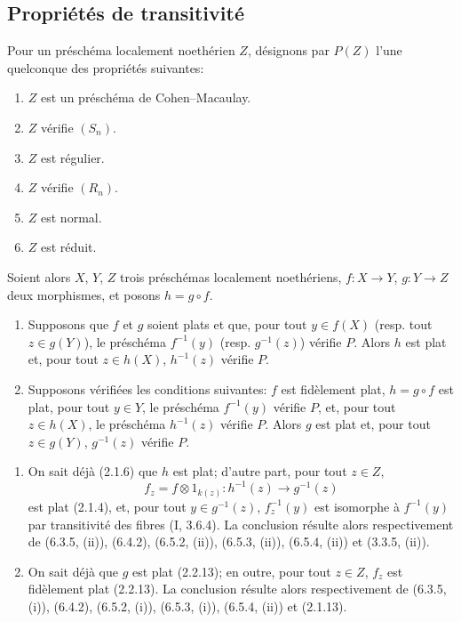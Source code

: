 
\subsection{Propriétés de transitivité}

\begin{proposition}[6.6.1]
\label{IV.2.s6.6.1-fr}
Pour un préschéma localement noethérien $Z$, désignons par $P(Z)$ l'une
quelconque des propriétés suivantes:
\begin{enumerate}
\item[(a)] $Z$ est un préschéma de Cohen--Macaulay.
\item[(b)] $Z$ vérifie $(S_n)$.
\item[(c)] $Z$ est régulier.
\item[(d)] $Z$ vérifie $(R_n)$.
\item[(e)] $Z$ est normal.
\item[(f)] $Z$ est réduit.
\end{enumerate}
Soient alors $X$, $Y$, $Z$ trois préschémas localement noethériens,
$f:X\to Y$, $g:Y\to Z$ deux morphismes, et posons $h=g\circ f$.
\begin{enumerate}
\item[(i)] Supposons que $f$ et $g$ soient plats et que, pour tout
$y\in f(X)$ (resp. tout $z\in g(Y)$), le préschéma $f^{-1}(y)$
(resp. $g^{-1}(z)$) vérifie $P$. Alors $h$ est plat et, pour tout
$z\in h(X)$, $h^{-1}(z)$ vérifie $P$.
\item[(ii)] Supposons vérifiées les conditions suivantes: $f$ est
fidèlement plat, $h=g\circ f$ est plat, pour tout $y\in Y$, le
préschéma $f^{-1}(y)$ vérifie $P$, et, pour tout $z\in h(X)$, le
préschéma $h^{-1}(z)$ vérifie $P$. Alors $g$ est plat et, pour tout
$z\in g(Y)$, $g^{-1}(z)$ vérifie $P$.
\end{enumerate}
\begin{enumerate}
\item[(i)] On sait déjà (2.1.6) que $h$ est plat; d'autre part, pour
      tout $z\in Z$,
\[
 f_z=f\otimes 1_{k(z)}:h^{-1}(z)\longrightarrow g^{-1}(z)
\]
est plat (2.1.4), et, pour tout $y\in g^{-1}(z)$, $f_z^{-1}(y)$ est
isomorphe à $f^{-1}(y)$ par transitivité des fibres (I, 3.6.4). La
conclusion résulte alors respectivement de (6.3.5, (ii)), (6.4.2),
(6.5.2, (ii)), (6.5.3, (ii)), (6.5.4, (ii)) et (3.3.5, (ii)).
\item[(ii)] On sait déjà que $g$ est plat (2.2.13); en outre, pour
      tout $z\in Z$, $f_z$ est fidèlement plat (2.2.13). La conclusion
      résulte alors respectivement de (6.3.5, (i)), (6.4.2),
(6.5.2, (i)), (6.5.3, (i)), (6.5.4, (ii)) et (2.1.13).
\end{enumerate}
\end{proposition}

